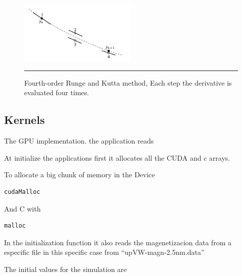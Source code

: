 \begin{figure}[htbp]
	\centering
		\includegraphics[width=0.5\textwidth]{Figures/rk4.png}
		\rule{35em}{0.5pt}
	\caption[Fourth-order Runge and Kutta Method]{Fourth-order Runge and Kutta method, Each step the derivative is evaluated four times. }
	\label{fig:kutta}
\end{figure}

\cite{numerical}




\subsection{Kernels}

The GPU implementation. the application reads

At initialize the applications first it allocates all the CUDA and c arrays.

To allocate a big chunk of memory in the Device 

\begin{lstlisting}[frame=none]
cudaMalloc
\end{lstlisting}
And C with

\begin{lstlisting}[frame=none]
malloc
\end{lstlisting}

In the initialization function it also reads the magenetizacion data from a especific file in this specific case from ``upVW-magn-2.5nm.data''


The initial values for the simulation are

